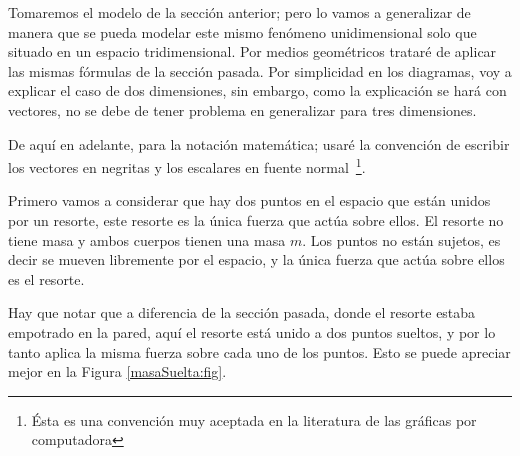 Tomaremos el modelo de la sección anterior; pero lo vamos a generalizar de manera que se pueda modelar este mismo fenómeno unidimensional solo que situado en un espacio tridimensional.
Por medios geométricos trataré de aplicar las mismas fórmulas de la sección pasada.
Por simplicidad en los diagramas, voy a explicar el caso de dos dimensiones, sin embargo, como la explicación se hará con vectores, no se debe de tener problema en generalizar para tres dimensiones.

De aquí en adelante, para la notación matemática; usaré la convención de escribir los vectores en negritas y los escalares en fuente normal~\footnote{Ésta es una convención muy aceptada en la literatura de las gráficas por computadora}.

Primero vamos a considerar que hay dos puntos en el espacio que están unidos por un resorte, este resorte es la única fuerza que actúa sobre ellos.
El resorte no tiene masa y ambos cuerpos tienen una masa $m$.
Los puntos no están sujetos, es decir se mueven libremente por el espacio, y la única fuerza que actúa sobre ellos es el resorte.

Hay que notar que a diferencia de la sección pasada, donde el resorte estaba empotrado en la pared, aquí el resorte está unido a dos puntos sueltos, y por lo tanto aplica la misma fuerza sobre cada uno de los puntos.
Esto se puede apreciar mejor en la Figura \ref{masaSuelta:fig}.

